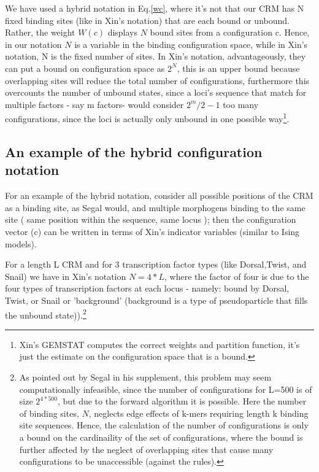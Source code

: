 We have used a hybrid notation in Eq.\ref{wc}, where it's not that our CRM has N fixed binding sites (like in Xin's notation) that are each bound or unbound.  Rather, the weight $W(c)$ displays $N$ bound sites from a configuration c.  Hence, in our notation $N$ is a variable in the binding configuration space, while in Xin's notation, N is the fixed number of sites.  In Xin's notation, advantageously, they can put a bound on configuration space as $2^N$, this is an upper bound because overlapping sites will reduce the total number of configurations, furthermore this overcounts the number of unbound states, since a loci's sequence that match for multiple factors - say m factors- would consider $2^m/2-1$ too many configurations, since the loci is actually only unbound in one possible way\footnote{Xin's GEMSTAT computes the correct weights and partition function, it's just the estimate on the configuration space that is a bound.}.   
\subsection{An example of the hybrid configuration notation} 
For an example of the hybrid notation, consider all possible positions of the CRM as a binding site, as Segal would, and multiple morphogens binding to the same site ( same position within the sequence, same locus ); then the configuration vector (c) can be written in terms of Xin's indicator variables (similar to Ising models).  
 
For a length L CRM and for 3 transcription factor types (like Dorsal,Twist, and Snail) we have in Xin's notation $N =4*L$, where the factor of four is due to the four types of transcription factors at each locus - namely: bound by Dorsal, Twist, or Snail or 'background' (background is a type of pseudoparticle that fills the unbound state)).\footnote{As pointed out by Segal in his supplement, this problem may seem computationally infeasible, since the number of configurations for L=500 is of size $2^{4*500}$, but due to the forward algorithm it is possible.  Here the number of binding sites, $N$, neglects edge effects of k-mers requiring length k binding site sequences.  Hence, the calculation of the number of configurations is only a bound on the cardinaility of the set of configurations, where the bound is further affected by the neglect of overlapping sites that cause many configurations to be unaccessible (against the rules). } 

